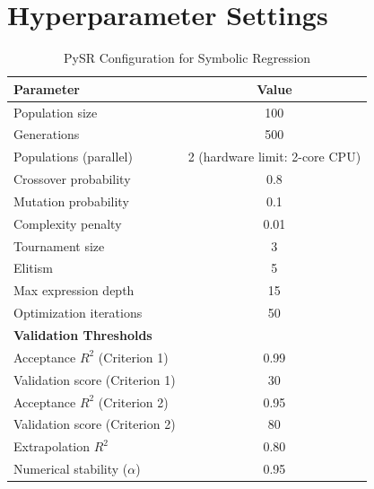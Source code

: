 \documentclass[twoside,11pt]{article}
\begin{document}


\section{Hyperparameter Settings}
\label{app:hyperparameters}

\begin{table}[H]
\centering
\caption{PySR Configuration for Symbolic Regression}
\label{tab:hyperparameters}
\begin{tabular}{@{}lc@{}}
\toprule
\textbf{Parameter} & \textbf{Value} \\
\midrule
Population size & 100 \\
Generations & 500 \\
Populations (parallel) & 2 (hardware limit: 2-core CPU) \\
Crossover probability & 0.8 \\
Mutation probability & 0.1 \\
Complexity penalty & 0.01 \\
Tournament size & 3 \\
Elitism & 5 \\
Max expression depth & 15 \\
Optimization iterations & 50 \\
\midrule
\textbf{Validation Thresholds} & \\
\midrule
Acceptance $R^2$ (Criterion 1) & 0.99 \\
Validation score (Criterion 1) & 30 \\
Acceptance $R^2$ (Criterion 2) & 0.95 \\
Validation score (Criterion 2) & 80 \\
Extrapolation $R^2$ & 0.80 \\
Numerical stability ($\alpha$) & 0.95 \\
\bottomrule
\end{tabular}
\end{table}
\end{document}
